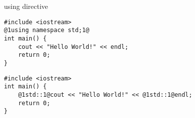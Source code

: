 \begin{frame}[fragile,label=using]{using directive}
\begin{lstlisting}
#include <iostream>
@1using namespace std;1@
int main() {
    cout << "Hello World!" << endl;
    return 0;
}
\end{lstlisting}
\hline
\begin{lstlisting}
#include <iostream>
int main() {
    @1std::1@cout << "Hello World!" << @1std::1@endl;
    return 0;
}
\end{lstlisting}
\end{frame}
